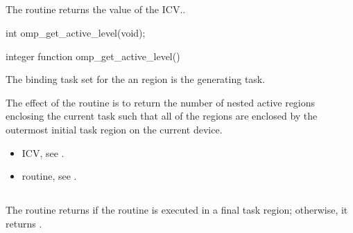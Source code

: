 \subsection{}
\label{subsec:omp_get_active_level}
\summary
The  routine returns the value of the  ICV..

\format
\begin{ccppspecific}
\begin{ompcFunction}
int omp_get_active_level(void);
\end{ompcFunction}
\end{ccppspecific}

\begin{fortranspecific}
\begin{ompfFunction}
integer function omp_get_active_level()
\end{ompfFunction}
\end{fortranspecific}

\binding
The binding task set for the an  region is the generating
task.

\effect
The effect of the  routine is to return the number of nested
active  regions enclosing the current task such that all of the 
regions are enclosed by the outermost initial task region on the current device.

\crossreferences
\begin{itemize}
\item {} ICV, see
.

\item {} routine, see
.
\end{itemize}











\subsection{}
\label{subsec:omp_in_final}
\summary
The  routine returns  if the routine is executed in a final task
region; otherwise, it returns .

